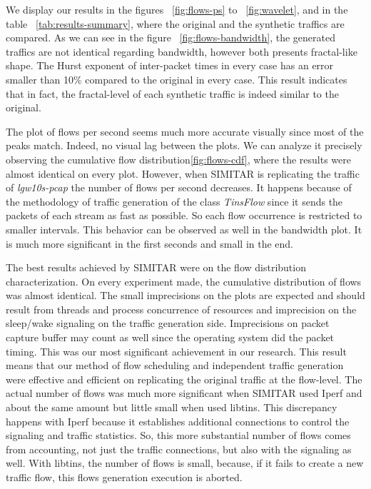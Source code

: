 We display our results in the figures ~\ref{fig:flows-ps} to ~\ref{fig:wavelet}, and in the table ~\ref{tab:results-summary}, where the original and the synthetic traffics are compared. As we can see in the figure ~\ref{fig:flows-bandwidth}, the generated traffics are not identical regarding bandwidth, however both presents fractal-like shape. The Hurst exponent of inter-packet times in every case has an error smaller than 10\% compared to the original in every case. This result indicates that in fact, the fractal-level of each synthetic traffic is indeed similar to the original.  

The plot of flows per second seems much more accurate visually since most of the peaks match.  Indeed, no visual lag between the plots. We can analyze it precisely observing the cumulative flow distribution\ref{fig:flows-cdf}, where the results were almost identical on every plot. However, when SIMITAR is replicating the traffic of \textit{lgw10s-pcap} the number of flows per second decreases. It happens because of the methodology of traffic generation of the class \textit{TinsFlow} since it sends the packets of each stream as fast as possible. So each flow occurrence is restricted to smaller intervals. This behavior can be observed as well in the bandwidth plot. It is much more significant in the first seconds and small in  the end.

The best results achieved by SIMITAR were on the flow distribution characterization. On every experiment made, the cumulative distribution of flows was almost identical. The small imprecisions on the plots are expected and should result from threads and process concurrence of resources and imprecision on the sleep/wake signaling on the traffic generation side. Imprecisions on packet capture buffer may count as well since the operating system did the packet timing. This was our most significant achievement in our research. This result means that our method of flow scheduling and independent traffic generation were effective and efficient on replicating the original traffic at the flow-level. The actual number of flows was much more significant when SIMITAR used Iperf and about the same amount but little small when used libtins. This discrepancy happens with Iperf because it establishes additional connections to control the signaling and traffic statistics.  So, this more substantial number of flows comes from accounting, not just the traffic connections, but also with the signaling as well.  With libtins, the number of flows is small, because, if it fails to create a new traffic flow, this flows generation execution is aborted. 

